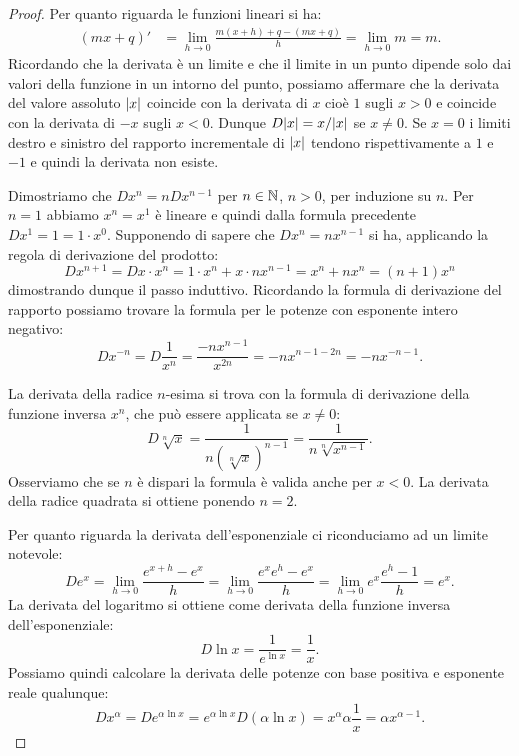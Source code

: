 \begin{proof}
\mymark{**}
Per quanto riguarda le funzioni lineari si ha:
\begin{align*}
(mx+q)' &= \lim_{h\to 0}\frac{m(x+h)+q - (mx+q)}{h} = \lim_{h\to 0} m = m.
\end{align*}
Ricordando che la derivata è un limite e che il limite in un punto dipende 
solo dai valori della funzione in un intorno del punto, 
possiamo affermare che la derivata del valore assoluto ${\left|x\right|}$ 
coincide con la derivata di $x$ cioè $1$ sugli $x>0$ e coincide 
con la derivata di $-x$ sugli $x<0$. Dunque $D {\left|x\right|} = x / {\left|x\right|}$ 
se $x\neq 0$. 
Se $x=0$ i limiti destro e sinistro del rapporto incrementale di ${\left|x\right|}$ 
tendono rispettivamente a $1$ e $-1$ e quindi la derivata non esiste.

Dimostriamo che $Dx^n = n D x^{n-1}$ per $n\in {\mathbb N}$, $n>0$, 
per induzione su $n$. Per $n=1$ abbiamo $x^n=x^1$ è lineare 
e quindi dalla formula precedente $Dx^1 = 1 = 1 \cdot x^0$. 
Supponendo di sapere che $D x^n = n x^{n-1}$ si ha, applicando 
la regola di derivazione del prodotto:
\[
  D x^{n+1} = D x\cdot x^n = 1 \cdot x^n + x \cdot n x^{n-1}
   = x^n + n x^n = (n+1) x^n
\]
dimostrando dunque il passo induttivo.
Ricordando la formula di derivazione del rapporto
possiamo trovare la formula per le potenze con esponente intero negativo:
\[
  D x^{-n} = D \frac{1}{x^n} = \frac{-n x^{n-1}}{x^{2n}}
   = -n x^{n-1-2n} = -n x^{-n-1}.
\]

La derivata della radice $n$-esima si trova con la formula di derivazione della funzione inversa $x^n$, che può essere applicata se $x\neq 0$:
\[
  D \sqrt[n]{x} = \frac{1}{n(\sqrt[n]{x})^{n-1}}
    = \frac{1}{n\sqrt[n]{x^{n-1}}}.
\]
Osserviamo che se $n$ è dispari la formula è valida anche per $x<0$.
La derivata della radice quadrata si ottiene ponendo $n=2$.

Per quanto riguarda la derivata dell'esponenziale
ci riconduciamo ad un limite notevole:
\[
  D e^x = \lim_{h\to 0} \frac{e^{x+h}-e^x}{h}
  = \lim_{h\to 0}\frac{e^x e^h - e^x}{h}
  = \lim_{h\to 0}e^x \frac{e^h - 1}{h}
  = e^x.
\]
La derivata del logaritmo si ottiene come derivata della funzione inversa dell'esponenziale:
\[
  D \ln x = \frac{1}{e^{\ln x}} = \frac{1}{x}.
\]
Possiamo quindi calcolare la derivata delle potenze con base positiva e esponente reale qualunque:
\[
D x^\alpha
= D e^{\alpha \ln x}
= e^{\alpha \ln x} D(\alpha \ln x)
= x^\alpha \alpha \frac{1}{x}
= \alpha x^{\alpha -1}.
\]


\end{proof}
